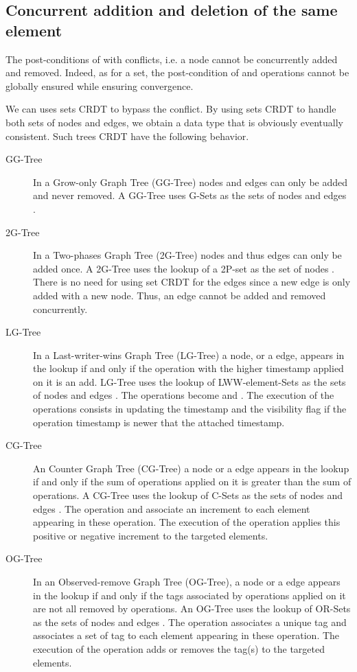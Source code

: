 \documentclass[a4paper]{article}
\begin{document}
\subsection{Concurrent addition and deletion of the same element}

The post-conditions of  with 
conflicts, i.e. a node cannot be concurrently added and
removed. Indeed, as for a set, the post-condition of  and 
operations cannot be globally ensured while ensuring convergence.

We can uses sets CRDT to bypass the conflict.  By using sets CRDT to
handle both sets of nodes and edges, we obtain a data type 
that is obviously eventually consistent. Such trees CRDT have the
following behavior.

\begin{description}
\item[GG-Tree] In a Grow-only Graph Tree (GG-Tree) nodes and edges can
  only be added and never removed. A GG-Tree uses G-Sets as the sets
  of nodes  and edges .
\item[2G-Tree] In a Two-phases Graph Tree (2G-Tree) nodes and thus
  edges can only be added once. A 2G-Tree uses the lookup of a 2P-set
  as the set of nodes .  There is no need for using set CRDT for
  the edges since a new edge is only added with a new node. Thus, an
  edge cannot be added and removed concurrently.
\item[LG-Tree] In a Last-writer-wins Graph Tree (LG-Tree) a node, or a
  edge, appears in the lookup if and only if the operation with the
  higher timestamp applied on it is an add. LG-Tree uses the lookup of
  LWW-element-Sets as the sets of nodes  and edges . The
  operations become  and . The execution of
  the operations consists in updating the timestamp and the visibility
  flag if the operation timestamp is newer that the attached
  timestamp.
\item[CG-Tree] An Counter Graph Tree (CG-Tree) a node or a edge
  appears in the lookup if and only if the sum of  operations
  applied on it is greater than the sum of  operations. A CG-Tree
  uses the lookup of C-Sets as the sets of nodes  and edges
  . The operation  and  associate an increment to each
  element appearing in these operation.  The execution of the
  operation applies this positive or negative increment to the targeted
  elements.
\item[OG-Tree] In an Observed-remove Graph Tree (OG-Tree), a node or a
  edge appears in the lookup if and only if the tags associated by
   operations applied on it are not all removed by 
  operations. An OG-Tree uses the lookup of OR-Sets as the sets of
  nodes  and edges .  The operation  associates a unique tag
  and  associates a set of tag to each element appearing in these
  operation.  The execution of the operation adds or removes the
  tag(s) to the targeted elements.
\end{description}
\end{document}
